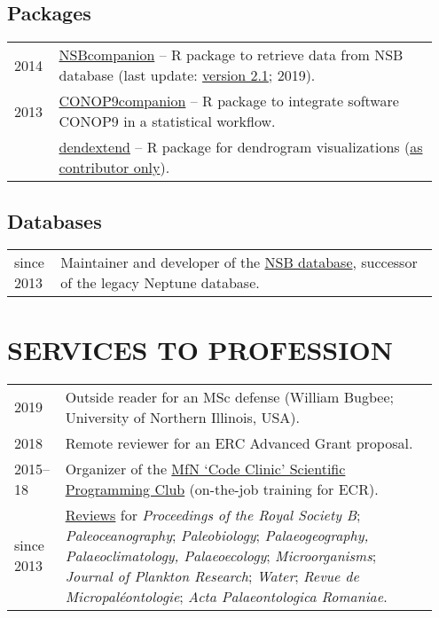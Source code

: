 \documentclass[11pt, a4paper]{article}
\begin{document}
\subsection{Packages}
\begin{longtable}{p{0.1\linewidth} P{0.85\linewidth}}
2014 & \href{http://github.com/plannapus/NSBcompanion}{NSBcompanion} -- R package to retrieve data from NSB database (last update: \href{http://doi.org/10.5281/zenodo.3408198}{version 2.1}; 2019).\\
2013 & \href{http://github.com/plannapus/CONOP9companion}{CONOP9companion} -- R package to integrate software CONOP9 in a statistical workflow.\\
     & \href{https://cran.r-project.org/web/packages/dendextend/index.html}{dendextend} -- R package for dendrogram visualizations (\underline{as contributor only}).\\
\end{longtable}
\subsection{Databases}
\begin{longtable}{p{0.1\linewidth} P{0.85\linewidth}}
since 2013 & Maintainer and developer of the \href{http://nsb-mfn-berlin.de/}{NSB database}, successor of the legacy Neptune database.\\
\end{longtable}

\section{SERVICES TO PROFESSION}
\begin{longtable}{p{0.1\linewidth} P{0.85\linewidth}}
2019 & Outside reader for an MSc defense (William Bugbee; University of Northern Illinois, USA).\\
2018 & Remote reviewer for an ERC Advanced Grant proposal.\\
2015--18 & Organizer of the \href{https://github.com/plannapus/MfN-Code-Clinic}{MfN `Code Clinic' Scientific Programming Club} (on-the-job training for ECR). \\
since 2013 & \href{http://publons.com/a/1291154/}{Reviews} for \textit{Proceedings of the Royal Society B}; \textit{Paleoceanography}; \textit{Paleobiology}; \textit{Palaeogeography, Palaeoclimatology, Palaeoecology}; \textit{Microorganisms}; \textit{Journal of Plankton Research}; \textit{Water}; \textit{Revue de Micropal\'{e}ontologie}; \textit{Acta Palaeontologica Romaniae}. \\
\end{longtable}
\end{document}
